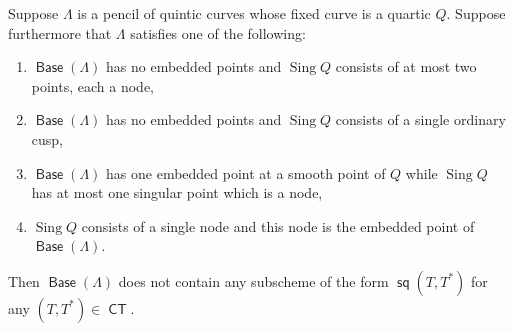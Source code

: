 \documentclass{article}
\DeclareMathOperator{\CT}{\mathsf{CT}}
\DeclareMathOperator{\s}{\mathsf{sq}}
\DeclareMathOperator{\Base}{\mathsf{Base}}
\DeclareMathOperator{\Sing}{Sing}
\begin{document}
\begin{lemma}
    \label{lemma:QLNo}
    Suppose $\Lambda$ is a pencil of quintic curves whose fixed curve is a quartic $Q$.
    Suppose furthermore that $\Lambda$ satisfies one of the following: 
    \begin{enumerate}
        \item[(a)] $\Base(\Lambda)$ has no embedded points and $\Sing Q$ consists of at most two points, each a node,
        \item[(b)] $\Base(\Lambda)$ has no embedded points and $\Sing Q$ consists of a single ordinary cusp,
        \item[(c)] $\Base(\Lambda)$ has one embedded point at a smooth point of $Q$ while $\Sing Q$ has at most one singular point which is a node,
        \item[(d)] $\Sing Q$ consists of a single node and this node is the embedded point of $\Base(\Lambda)$.
    \end{enumerate}

    Then $\Base (\Lambda)$ does not contain any subscheme of the form $\s(T,T^{*})$ for any $(T,T^{*}) \in \CT$.
\end{lemma}
\end{document}
